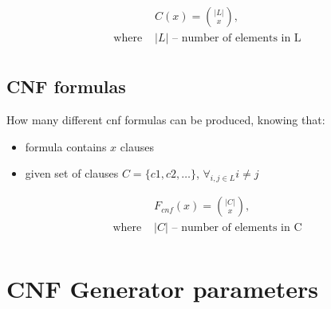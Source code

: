 \begin{align*}
	&C(x) = \binom{|L|}{x}, \\
	\text{where }
	&|L| \text{ -- number of elements in L} \\
\end{align*}

\subsection{CNF formulas}

How many different cnf formulas can be produced, knowing that:
\begin{itemize}
	\item formula contains $x$ clauses
	\item given set of clauses $C = \{c1, c2, \dots\}$, $\forall_{i,j \in L} i \neq j$
\end{itemize}

\begin{align*}
	&F_{cnf}(x) = \binom{|C|}{x}, \\
	\text{where }
	&|C| \text{ -- number of elements in C} \\
\end{align*}

\section{CNF Generator parameters}

